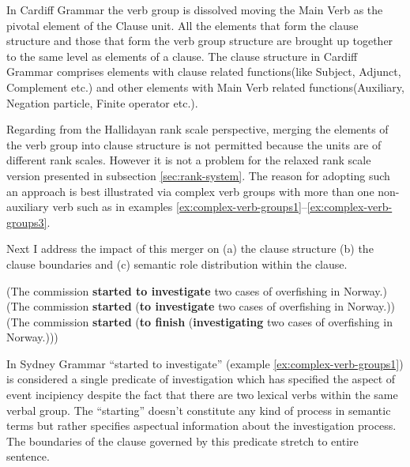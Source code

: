 In Cardiff Grammar the verb group is dissolved moving the Main Verb as the pivotal element of the Clause unit. All the elements that form the clause structure and those that form the verb group structure are brought up together to the same level as elements of a clause. The clause structure in Cardiff Grammar comprises elements with clause related functions(like Subject, Adjunct, Complement etc.) and other elements with Main Verb related functions(Auxiliary, Negation particle, Finite operator etc.).

Regarding from the Hallidayan rank scale perspective, merging the elements of the verb group into clause structure is not permitted because the units are of different rank scales. However it is not a problem for the relaxed rank scale version presented in subsection \ref{sec:rank-system}. The reason for adopting such an approach is best illustrated via complex verb groups with more than one non-auxiliary verb such as in examples \ref{ex:complex-verb-groups1}--\ref{ex:complex-verb-groups3}. 

Next I address the impact of this merger on (a) the clause structure (b) the clause boundaries and (c) semantic role distribution within the clause.

\begin{exe}
	\ex\label{ex:complex-verb-groups1}
	(The commission \textbf{started to investigate} two cases of overfishing in Norway.)  
	\ex\label{ex:complex-verb-groups2}
	(The commission \textbf{started} (\textbf{to investigate} two cases of overfishing in Norway.))
	\ex\label{ex:complex-verb-groups3}
	(The commission \textbf{started} (\textbf{to finish} (\textbf{investigating} two cases of overfishing in Norway.)))
\end{exe}

In Sydney Grammar ``started to investigate'' (example \ref{ex:complex-verb-groups1}) is considered a single predicate of investigation which has specified the aspect of event incipiency despite the fact that there are two lexical verbs within the same verbal group. The ``starting'' doesn't constitute any kind of process in semantic terms but rather specifies aspectual information about the investigation process. The boundaries of the clause governed by this predicate stretch to entire sentence.

